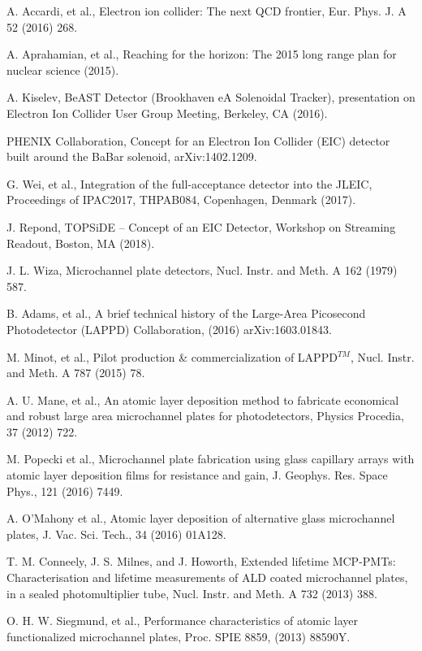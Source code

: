 \documentclass[preprint,5p]{elsarticle}
\begin{document}
\begin{thebibliography}{00}

A. Accardi, et al., Electron ion collider: The next QCD frontier, Eur. Phys. J. A 52 (2016) 268.

A. Aprahamian, et al., Reaching for the horizon: The 2015 long range plan for nuclear science (2015).

A. Kiselev, BeAST Detector (Brookhaven eA Solenoidal Tracker), presentation on Electron Ion Collider User Group Meeting, Berkeley, CA (2016).

PHENIX Collaboration, Concept for an Electron Ion Collider (EIC) detector built around the BaBar solenoid, arXiv:1402.1209.

G. Wei, et al., Integration of the full-acceptance detector into the JLEIC, Proceedings of IPAC2017, THPAB084, Copenhagen, Denmark (2017).

J. Repond, TOPSiDE – Concept of an EIC Detector, Workshop on Streaming Readout, Boston, MA (2018).

J. L. Wiza, Microchannel plate detectors, Nucl. Instr. and Meth. A 162 (1979) 587.

B. Adams, et al., A brief technical history of the Large-Area Picosecond Photodetector (LAPPD) Collaboration, (2016) arXiv:1603.01843.

M. Minot, et al., Pilot production \& commercialization of LAPPD$^{𝑇𝑀}$, 
      Nucl.  Instr. and Meth. A 787 (2015) 78.

A. U. Mane, et al., An atomic layer deposition method to fabricate economical and robust large area microchannel plates for photodetectors, Physics Procedia, 37 (2012) 722.

M. Popecki et al., Microchannel plate fabrication using glass capillary arrays with atomic layer deposition films for resistance and gain, J. Geophys. Res. Space Phys., 121 (2016) 7449.

A. O'Mahony et al., Atomic layer deposition of alternative glass microchannel plates, J. Vac. Sci. Tech., 34 (2016) 01A128.

T. M. Conneely, J. S. Milnes, and J. Howorth, Extended lifetime MCP-PMTs: Characterisation and lifetime measurements of ALD coated microchannel plates, in a sealed photomultiplier tube, Nucl. Instr. and Meth. A 732 (2013) 388.

O. H. W. Siegmund, et al., Performance characteristics of atomic layer functionalized microchannel plates, Proc. SPIE 8859, (2013) 88590Y.


\end{thebibliography}
\end{document}
